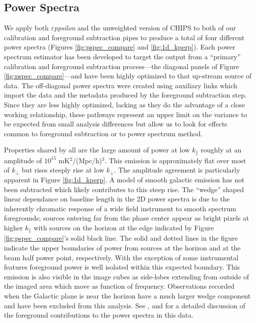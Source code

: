 \documentclass[twolcolumn,iop]{emulateapj}
\def\eppsilon{{\it $\varepsilon$ppsilon}}
\begin{document}
\subsection{Power Spectra}
\label{sec:power_spectrum_comparison}
We apply both \eppsilon{} and the unweighted version of CHIPS to both of our calibration and foreground subtraction pipes to produce a total of four different power spectra (Figures \ref{fig:pspec_compare} and \ref{fig:1d_kperp}).  Each power spectrum estimator has been developed to target the output from a ``primary'' calibration and foreground subtraction process---the diagonal panels of Figure \ref{fig:pspec_compare}---and have been highly optimized to that up-stream source of data.  The off-diagonal power spectra were created using auxiliary links which import the data and the metadata produced by the foreground subtraction step.  Since they are less highly optimized, lacking as they do the advantage of a close working relationship, these pathways represent an upper limit on the variance to be expected from small analysis differences but allow us to look for effects common to foreground subtraction or to power spectrum method.


Properties shared by all are the large amount of power at low $k_{\parallel}$ roughly at an amplitude of $10^{15}$ mK$^2$/(Mpc/h)$^3$. This emission is approximately flat over most of $k_{\perp}$ but rises steeply rise at low $k_\perp$. The amplitude agreement is particularly apparent in Figure \ref{fig:1d_kperp}. A model of smooth galactic emission has not been subtracted which likely contributes to this steep rise. The ``wedge'' shaped linear dependance on baseline length in the 2D power spectra is due to the inherently chromatic response of a wide field instrument to smooth spectrum foregrounds; sources entering far from the phase center appear as bright pixels at higher $k_\parallel$ with sources on the horizon at the edge indicated by Figure \ref{fig:pspec_compare}'s  solid black line. The solid and dotted lines in the figure indicate the upper boundaries of power from sources at the horizon and at the beam half power point, respectively.  With the exception of some instrumental features foreground power is well isolated within this expected boundary. This emission is also visible in the image cubes as side-lobes extending from outside of the imaged area which move as function of frequency.  Observations recorded when the Galactic plane is near the horizon have a much larger wedge component and have been excluded from this analysis. See \cite{2015ApJ...804...14T}, \cite{2015ApJ...807L..28T} and \cite{Pober:2016ApJ...819....8P} for a detailed discussion of the foreground contributions to the power spectra in this data. 
\end{document}
